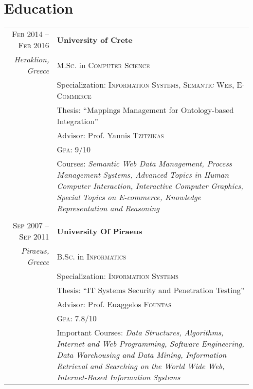 \documentclass[11pt]{article}
\begin{document}
\section{Education}
\begin{longtable}{r|p{12.5cm}}

\textsc{Feb 2014 – Feb 2016} & \textbf{University of Crete} \\
\footnotesize{\textit{Heraklion, Greece}} & \textsc{M.Sc.} in \textsc{Computer Science} \\
& Specialization: \textsc{Information Systems, Semantic Web, E-Commerce} \\
& Thesis: ``Mappings Management for Ontology-based Integration'' \\
& \footnotesize \small Advisor: Prof. Yannis \textsc{Tzitzikas}\\
&\normalsize \textsc{Gpa}: 9/10 \\
&\footnotesize{Courses: \textit{Semantic Web Data Management, Process Management Systems, Advanced Topics in Human-Computer Interaction, Interactive Computer Graphics, Special Topics on E-commerce, Knowledge Representation and Reasoning}}\\

\multicolumn{2}{c}{} \\
\textsc{Sep 2007 – Sep 2011} & \textbf{University Of Piraeus} \\
\footnotesize{\textit{Piraeus, Greece}} & \textsc{B.Sc.} in \textsc{Informatics} \\
& Specialization: \textsc{Information Systems} \\
& Thesis: ``IT Systems Security and Penetration Testing'' \\
& \footnotesize \small Advisor: Prof. Euaggelos \textsc{Fountas}\\
&\normalsize \textsc{Gpa}: 7.8/10 \\
&\footnotesize{Important Courses: \textit{Data Structures, Algorithms, Internet and
Web Programming, Software Engineering, Data Warehousing
and Data Mining, Information Retrieval and Searching on the
World Wide Web, Internet-Based Information Systems}}

\end{longtable}

\end{document}
